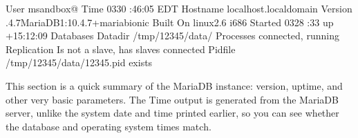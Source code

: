 \documentclass[letterpaper,10pt,english]{sphinxmanual}
\begin{document}
\begin{sphinxVerbatim}[commandchars=\\\{\}]
                     User  msandbox@\PYGZpc{}
                     Time  \PYGZhy{}03\PYGZhy{}30 :46:05 EDT
                 Hostname  localhost.localdomain
                  Version  .4.7\PYGZhy{}MariaDB\PYGZhy{}1:10.4.7+maria\PYGZti{}bionic
                 Built On  linux2.6 i686
                  Started  \PYGZhy{}03\PYGZhy{}28 :33 up +15:12:09
                Databases  
                  Datadir  /tmp/12345/data/
                Processes   connected,  running
              Replication  Is not a slave, has  slaves connected
                  Pidfile  /tmp/12345/data/12345.pid exists
\end{sphinxVerbatim}

This section is a quick summary of the MariaDB instance: version, uptime, and
other very basic parameters. The Time output is generated from the MariaDB server,
unlike the system date and time printed earlier, so you can see whether the
database and operating system times match.
\end{document}
